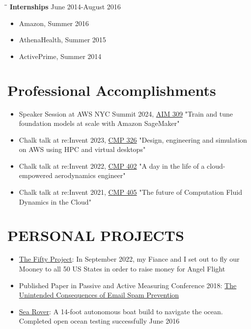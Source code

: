 \documentclass{res}
\begin{document}
\begin{resume}
\vspace{-0.15in}
 \begin{tabbing}
   \hspace{2.5in}\= \hspace{2.6in}\= \kill %
    {\bf Internships} \>     \>June 2014-August 2016
   \end{tabbing}\vspace{-10pt}      %
   \begin{itemize}
   \setlength\itemsep{0em}
   \item Amazon, Summer 2016
   \item AthenaHealth, Summer 2015
   \item ActivePrime, Summer 2014
    \end{itemize}
\vspace{-0.10in}
\section{Professional Accomplishments}    
	\begin{itemize}
   	\setlength\itemsep{0em}
        \item Speaker Session at AWS NYC Summit 2024, \href{https://swsmith.cc/slides/aim309-slides.pdf}{AIM 309} "Train and tune foundation models at scale with Amazon SageMaker"
        \item Chalk talk at re:Invent 2023, \href{https://swsmith.cc/slides/cmp326-RES.pdf}{CMP 326} "Design, engineering and simulation on AWS using HPC and virtual desktops"
        \item Chalk talk at re:Invent 2022, \href{https://swsmith.cc/slides/cmp402-slides.pdf}{CMP 402} "A day in the life of a cloud-empowered aerodynamics engineer"
        \item Chalk talk at re:Invent 2021, \href{https://swsmith.cc/slides/cmp405-slides.pdf}{CMP 405} "The future of Computation Fluid Dynamics in the Cloud"
        \end{itemize}
\vspace{-0.10in}
\section{PERSONAL PROJECTS}    
	\begin{itemize}
   	\setlength\itemsep{0em}   
         \item \href{https://thefiftyproject.com/}{The Fifty Project}: In September 2022, my Fiance and I set out to fly our Mooney to all 50 US States in order to raise money for Angel Flight
  		 \item Published Paper in Passive and Active Measuring Conference 2018: \href{https://www.cs.huji.ac.il/~yossigi/pam18.pdf}{The Unintended Consequences of Email Spam Prevention}
         \item \href{https://www.kickstarter.com/projects/bdommie/sea-rover}{Sea Rover}: A 14-foot autonomous boat build to navigate the ocean. Completed open ocean testing successfully June 2016
    		\end{itemize}
\vspace{-0.10in}

\end{resume}
\end{document}
